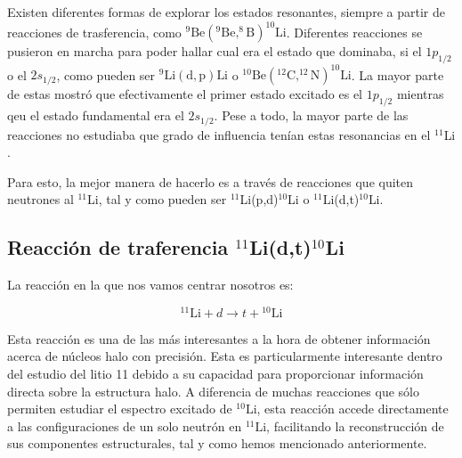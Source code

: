 Existen diferentes formas de explorar los estados resonantes, siempre a partir de reacciones de trasferencia, como $^{9}\text{Be}(^{9}\text{Be},^{8}\text{B})^{10}\text{Li}$. Diferentes reacciones se pusieron en marcha para poder hallar cual era el estado que dominaba, si el $1p_{1/2}$ o el $2s_{1/2}$, como pueden ser $^{9}\text{Li}(\text{d},\text{p})\text{Li}$ o $^{10}\text{Be}(^{12}\text{C},^{12}\text{N})^{10}\text{Li}$. La mayor parte de estas mostró que efectivamente el primer estado excitado es el $1p_{1/2}$ mientras qeu el estado fundamental era el $2s_{1/2}$. Pese a todo, la mayor parte de las reacciones no estudiaba que grado de influencia tenían estas resonancias en el $^{11}$Li \cite{SANETULLAEV2016481}.

Para esto, la mejor manera de hacerlo es a través de reacciones que quiten neutrones al $^{11}$Li, tal y como pueden ser  $^{11}$Li(p,d)$^{10}$Li o $^{11}$Li(d,t)$^{10}$Li. 




\subsection{Reacción de traferencia $^{11}$Li(d,t)$^{10}$Li}

La reacción en la que nos vamos centrar nosotros es: 

\begin{equation}
   {}^{11}\text{Li} + d \to t + {}^{10}\text{Li}
\end{equation}

Esta reacción es una de las más interesantes a la hora de obtener información acerca de núcleos halo con precisión. Esta es particularmente interesante dentro del estudio del litio 11 debido a su capacidad para proporcionar información directa sobre la estructura halo. A diferencia de muchas reacciones que sólo permiten estudiar el espectro excitado de \({}^{10}\text{Li}\), esta reacción accede directamente a las configuraciones de un solo neutrón en \({}^{11}\text{Li}\), facilitando la reconstrucción de sus componentes estructurales, tal y como hemos mencionado anteriormente.


